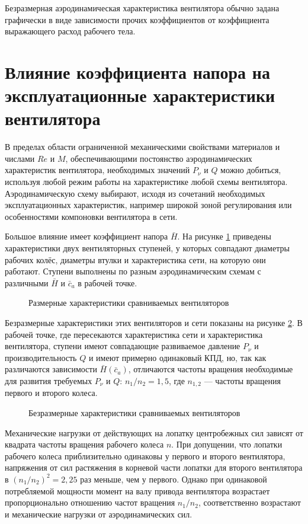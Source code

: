Безразмерная аэродинамическая характеристика вентилятора обычно задана графически в виде зависимости прочих коэффициентов от коэффициента выражающего расход рабочего тела.

\section{Влияние коэффициента напора на эксплуатационные характеристики вентилятора}\label{ch1/sec2}

В пределах области ограниченной механическими свойствами материалов и числами \(Re\) и \(M\), обеспечивающими постоянство аэродинамических характеристик вентилятора, необходимых значений \(P_\nu\) и \(Q\) можно добиться, используя любой режим работы на характеристике любой схемы вентилятора. Аэродинамическую схему выбирают, исходя из сочетаний необходимых эксплуатационных характеристик, например широкой зоной регулирования или особенностями компоновки вентилятора в сети. 

Большое влияние имеет коэффициент напора \(\bar{H}\). На рисунке \cref{fig:pq2} приведены характеристики двух вентиляторных ступеней, у которых совпадают диаметры рабочих колёс, диаметры втулки и характеристика сети, на которую они работают. Ступени выполнены по разным аэродинамическим схемам с различными \(\bar{H}\) и \(\bar{c}_{a}\) в рабочей точке.

\begin{figure}[h]
	\centerfloat{	
		
	}
	\caption{Размерные характеристики сравниваемых вентиляторов}
	\label{fig:pq2}
\end{figure}

Безразмерные характеристики этих вентиляторов и сети показаны на рисунке \cref{fig:pq}. В рабочей точке, где пересекаются характеристика сети и характеристика вентилятора, ступени имеют совпадающие развиваемое давление \( P_\nu \) и производительность \(Q\) и имеют примерно одинаковый КПД, но, так как различаются зависимости \(\bar{H}(\bar{c}_{a})\), отличаются частоты вращения необходимые для развития требуемых \(P_{\nu}\) и \(Q\): \(n_1/n_2 = 1,5\), где \(n_{1,2}\) –-- частоты вращения первого и второго колеса.

\begin{figure}[h]
	\centerfloat{	
		
	}
	\caption{Безразмерные характеристики сравниваемых вентиляторов}
	\label{fig:pq}
\end{figure}

Механические нагрузки от действующих на лопатку центробежных сил зависят от квадрата частоты вращения рабочего колеса \(n\). При допущении, что лопатки рабочего колеса приблизительно одинаковы у первого и второго вентилятора, напряжения от сил растяжения в корневой части лопатки для второго вентилятора в \((n_1 / n_2)^2  = 2,25\) раз меньше, чем у первого. Однако при одинаковой потребляемой мощности момент на валу привода вентилятора возрастает пропорционально отношению частот вращения \(n_1 / n_2\), соответственно возрастают и механические нагрузки от аэродинамических сил.

